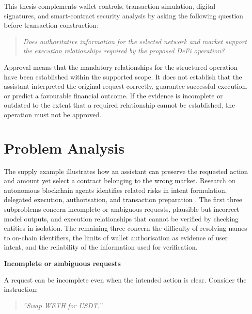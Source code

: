 This thesis complements wallet controls, transaction simulation,
digital signatures, and smart-contract security analysis by asking
the following question before transaction construction:

\begin{quote}
\textit{Does authoritative information for the selected network and
market support the execution relationships required by the proposed
DeFi operation?}
\end{quote}

Approval means that the mandatory relationships for the structured
operation have been established within the supported scope. It does
not establish that the assistant interpreted the original request
correctly, guarantee successful execution, or predict a favourable
financial outcome. If the evidence is incomplete or outdated to the
extent that a required relationship cannot be established, the
operation must not be approved.

\section{Problem Analysis}
\label{sec:problem_analysis}

\providecommand{\problemheading}[1]{%
  \par\addvspace{0.8\baselineskip}%
  \noindent\textbf{#1}\par\nobreak\smallskip\nobreak
  \noindent\ignorespaces}

The supply example illustrates how an assistant can preserve the requested
action and amount yet select a contract belonging to the wrong market.
Research on autonomous blockchain agents identifies related risks in intent
formulation, delegated execution, authorisation, and transaction preparation
\cite{alqithamiAutonomousAgentsBlockchains2026}. The first three subproblems concern incomplete or ambiguous requests,
plausible but incorrect model outputs, and execution relationships that
cannot be verified by checking entities in isolation. The remaining three
concern the difficulty of resolving names to on-chain identifiers, the
limits of wallet authorisation as evidence of user intent, and the
reliability of the information used for verification.

\problemheading{Incomplete or ambiguous requests}
A request can be incomplete even when the intended action is clear.
Consider the instruction:

\begin{quote}
\textit{``Swap WETH for USDT.''}
\end{quote}

